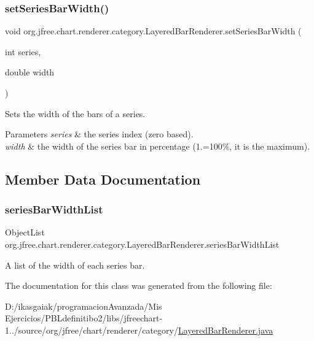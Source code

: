 \subsubsection{\texorpdfstring{set\+Series\+Bar\+Width()}{setSeriesBarWidth()}}
{\footnotesize\ttfamily void org.\+jfree.\+chart.\+renderer.\+category.\+Layered\+Bar\+Renderer.\+set\+Series\+Bar\+Width (\begin{DoxyParamCaption}\item[{int}]{series,  }\item[{double}]{width }\end{DoxyParamCaption})}

Sets the width of the bars of a series.


\begin{DoxyParams}{Parameters}
{\em series} & the series index (zero based). \\
\hline
{\em width} & the width of the series bar in percentage (1.=100\%, it is the maximum). \\
\hline
\end{DoxyParams}


\subsection{Member Data Documentation}
\mbox{\label{classorg_1_1jfree_1_1chart_1_1renderer_1_1category_1_1_layered_bar_renderer_a84081edfe7822ea0111651d4c082c4d1}} 
\subsubsection{\texorpdfstring{series\+Bar\+Width\+List}{seriesBarWidthList}}
{\footnotesize\ttfamily Object\+List org.\+jfree.\+chart.\+renderer.\+category.\+Layered\+Bar\+Renderer.\+series\+Bar\+Width\+List\hspace{0.3cm}{\ttfamily [protected]}}

A list of the width of each series bar. 

The documentation for this class was generated from the following file\+:\begin{DoxyCompactItemize}
\item 
D\+:/ikasgaiak/programacion\+Avanzada/\+Mis Ejercicios/\+P\+B\+Ldefinitibo2/libs/jfreechart-\/1../source/org/jfree/chart/renderer/category/\mbox{\hyperlink{_layered_bar_renderer_8java}{Layered\+Bar\+Renderer.\+java}}\end{DoxyCompactItemize}
